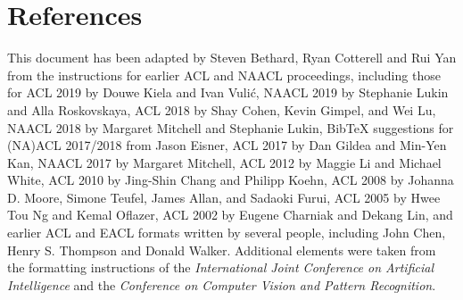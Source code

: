 \documentclass[11pt]{article}
\begin{document}
\section*{References}

This document has been adapted
by Steven Bethard, Ryan Cotterell and Rui Yan
from the instructions for earlier ACL and NAACL proceedings, including those for
ACL 2019 by Douwe Kiela and Ivan Vuli\'{c},
NAACL 2019 by Stephanie Lukin and Alla Roskovskaya,
ACL 2018 by Shay Cohen, Kevin Gimpel, and Wei Lu,
NAACL 2018 by Margaret Mitchell and Stephanie Lukin,
Bib\TeX{} suggestions for (NA)ACL 2017/2018 from Jason Eisner,
ACL 2017 by Dan Gildea and Min-Yen Kan,
NAACL 2017 by Margaret Mitchell,
ACL 2012 by Maggie Li and Michael White,
ACL 2010 by Jing-Shin Chang and Philipp Koehn,
ACL 2008 by Johanna D. Moore, Simone Teufel, James Allan, and Sadaoki Furui,
ACL 2005 by Hwee Tou Ng and Kemal Oflazer,
ACL 2002 by Eugene Charniak and Dekang Lin,
and earlier ACL and EACL formats written by several people, including
John Chen, Henry S. Thompson and Donald Walker.
Additional elements were taken from the formatting instructions of the \emph{International Joint Conference on Artificial Intelligence} and the \emph{Conference on Computer Vision and Pattern Recognition}.



\end{document}

